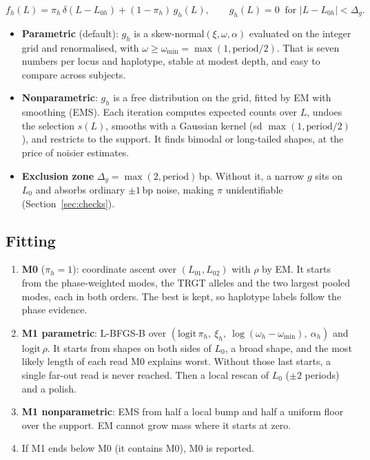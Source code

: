 \documentclass[10pt,a4paper]{article}
\begin{document}
\[
f_h(L)=\pi_h\,\delta(L-L_{0h})+(1-\pi_h)\,g_h(L),\qquad g_h(L)=0\ \text{ for }|L-L_{0h}|<\Delta_g .
\]
\begin{itemize}
\item \textbf{Parametric} (default): $g_h$ is a skew-normal$(\xi,\omega,\alpha)$ evaluated on the integer grid and
renormalised, with $\omega\geq\omega_{\min}=\max(1,\text{period}/2)$. That is seven numbers per locus and haplotype,
stable at modest depth, and easy to compare across subjects.
\item \textbf{Nonparametric}: $g_h$ is a free distribution on the grid, fitted by EM with smoothing (EMS). Each
iteration computes expected counts over $L$, undoes the selection $s(L)$, smooths with a Gaussian kernel
(sd $\max(1,\text{period}/2)$), and restricts to the support. It finds bimodal or long-tailed shapes, at the price of
noisier estimates.
\item \textbf{Exclusion zone} $\Delta_g=\max(2,\text{period})$\,bp. Without it, a narrow $g$ sits on $L_0$ and
absorbs ordinary $\pm1$\,bp noise, making $\pi$ unidentifiable (Section~\ref{sec:checks}).
\end{itemize}

\subsection{Fitting}
\begin{enumerate}
\item \textbf{M0} ($\pi_h=1$): coordinate ascent over $(L_{01},L_{02})$ with $\rho$ by EM. It starts from the
phase-weighted modes, the TRGT alleles and the two largest pooled modes, each in both orders. The best is kept, so
haplotype labels follow the phase evidence.
\item \textbf{M1 parametric}: L-BFGS-B over $(\mathrm{logit}\,\pi_h,\ \xi_h,\ \log(\omega_h-\omega_{\min}),\ \alpha_h)$
and $\mathrm{logit}\,\rho$. It starts from shapes on both sides of $L_0$, a broad shape, and the most likely length
of each read M0 explains worst. Without those last starts, a single far-out read is never reached. Then a local
rescan of $L_0$ ($\pm2$ periods) and a polish.
\item \textbf{M1 nonparametric}: EMS from half a local bump and half a uniform floor over the support. EM cannot
grow mass where it starts at zero.
\item If M1 ends below M0 (it contains M0), M0 is reported.
\end{enumerate}
\end{document}
